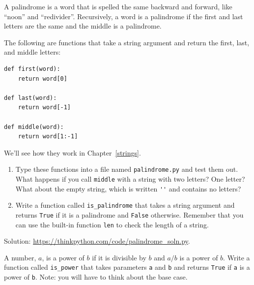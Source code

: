 \documentclass[10pt]{book}
\begin{document}
\begin{exercise}
\label{palindrome}

A palindrome is a word that is spelled the same backward and
forward, like ``noon'' and ``redivider''.  Recursively, a word
is a palindrome if the first and last letters are the same
and the middle is a palindrome.

The following are functions that take a string argument and
return the first, last, and middle letters:

\begin{verbatim}
def first(word):
    return word[0]

def last(word):
    return word[-1]

def middle(word):
    return word[1:-1]
\end{verbatim}
%
We'll see how they work in Chapter~\ref{strings}.

\begin{enumerate}

\item Type these functions into a file named {\tt palindrome.py}
and test them out.  What happens if you call {\tt middle} with
a string with two letters?  One letter?  What about the empty
string, which is written \verb"''" and contains no letters?

\item Write a function called \verb"is_palindrome" that takes
a string argument and returns {\tt True} if it is a palindrome
and {\tt False} otherwise.  Remember that you can use the
built-in function {\tt len} to check the length of a string.

\end{enumerate}

Solution: \url{https://thinkpython.com/code/palindrome_soln.py}.

\end{exercise}

\begin{exercise}

A number, $a$, is a power of $b$ if it is divisible by $b$
and $a/b$ is a power of $b$.  Write a function called
\verb"is_power" that takes parameters {\tt a} and {\tt b}
and returns {\tt True} if {\tt a} is a power of {\tt b}.
Note: you will have to think about the base case.

\end{exercise}
\end{document}
